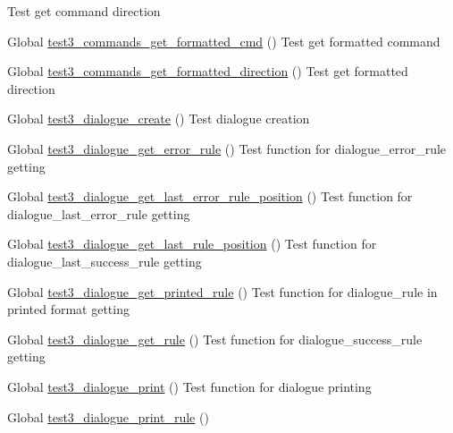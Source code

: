 \begin{DoxyRefList}
Test get command direction  
\item[Global \mbox{\hyperlink{command__test_8c_ad5b303e7813760f30b94a6a55cbfce8d}{test3\+\_\+commands\+\_\+get\+\_\+formatted\+\_\+cmd}} ()]\label{test__test000024}%
%
Test get formatted command  
\item[Global \mbox{\hyperlink{command__test_8c_a13cc3150acac93730f28ec177805fcd4}{test3\+\_\+commands\+\_\+get\+\_\+formatted\+\_\+direction}} ()]\label{test__test000027}%
%
Test get formatted direction  
\item[Global \mbox{\hyperlink{dialogue__test_8c_a9fe56633efb56e386d6ea753f56cfb67}{test3\+\_\+dialogue\+\_\+create}} ()]\label{test__test000030}%
%
Test dialogue creation  
\item[Global \mbox{\hyperlink{dialogue__test_8c_a2c3c7ad2a44aa83971767fb5b7a87dd7}{test3\+\_\+dialogue\+\_\+get\+\_\+error\+\_\+rule}} ()]\label{test__test000049}%
%
Test function for dialogue\+\_\+error\+\_\+rule getting  
\item[Global \mbox{\hyperlink{dialogue__test_8c_a82b285c94b51242b1419f7293bfc8ae2}{test3\+\_\+dialogue\+\_\+get\+\_\+last\+\_\+error\+\_\+rule\+\_\+position}} ()]\label{test__test000042}%
%
Test function for dialogue\+\_\+last\+\_\+error\+\_\+rule getting  
\item[Global \mbox{\hyperlink{dialogue__test_8c_acaa6654092ec4fbc5d1c1f455fe03c99}{test3\+\_\+dialogue\+\_\+get\+\_\+last\+\_\+rule\+\_\+position}} ()]\label{test__test000039}%
%
Test function for dialogue\+\_\+last\+\_\+success\+\_\+rule getting  
\item[Global \mbox{\hyperlink{dialogue__test_8c_a40a1c366172ef7e7c1c857602dbb4b33}{test3\+\_\+dialogue\+\_\+get\+\_\+printed\+\_\+rule}} ()]\label{test__test000069}%
%
Test function for dialogue\+\_\+rule in printed format getting  
\item[Global \mbox{\hyperlink{dialogue__test_8c_ab4737ebdfcbf899c1eb248a53a897cec}{test3\+\_\+dialogue\+\_\+get\+\_\+rule}} ()]\label{test__test000045}%
%
Test function for dialogue\+\_\+success\+\_\+rule getting  
\item[Global \mbox{\hyperlink{dialogue__test_8c_a0072d091a875e77dbd599054b9b40d79}{test3\+\_\+dialogue\+\_\+print}} ()]\label{test__test000079}%
%
Test function for dialogue printing  
\item[Global \mbox{\hyperlink{dialogue__test_8c_a812ca5b6a1e4d66fec039f12cfa2ee8c}{test3\+\_\+dialogue\+\_\+print\+\_\+rule}} ()]\label{test__test000059}%

\end{DoxyRefList}
